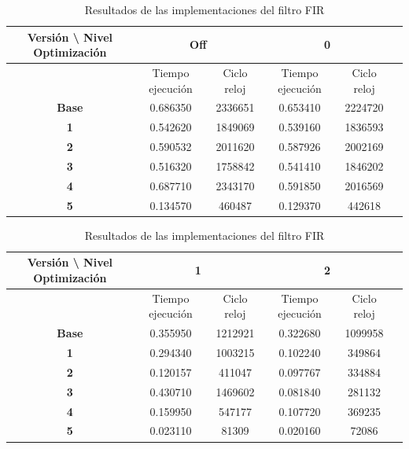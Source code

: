 \documentclass[11pt]{report}
\begin{document}
\begin{table}[H]
  \centering
  \begin{tabular}{|c|c|c|c|c|c|}
    \hline
    \textbf{Versión \textbackslash{} Nivel Optimización} & \multicolumn{2}{c|}{\textbf{Off}} & \multicolumn{2}{c|}{\textbf{0}} \\
    \hline
    & Tiempo ejecución & Ciclo reloj & Tiempo ejecución & Ciclo reloj \\
    \hline
    \textbf{Base} & 0.686350 & 2336651 & 0.653410 & 2224720 \\
    \hline
    \textbf{1} & 0.542620 & 1849069 & 0.539160 & 1836593 \\
    \hline
    \textbf{2} & 0.590532 & 2011620 & 0.587926 & 2002169 \\
    \hline
    \textbf{3} & 0.516320 & 1758842 & 0.541410 & 1846202 \\
    \hline
    \textbf{4} & 0.687710 & 2343170 & 0.591850 & 2016569 \\
    \hline
    \textbf{5} & 0.134570 & 460487 & 0.129370 & 442618 \\
    \hline
  \end{tabular}
  \caption{Resultados de las implementaciones del filtro FIR}
\end{table}

\begin{table}[H]
  \centering
  \begin{tabular}{|c|c|c|c|c|c|}
    \hline
    \textbf{Versión \textbackslash{} Nivel Optimización} & \multicolumn{2}{c|}{\textbf{1}} & \multicolumn{2}{c|}{\textbf{2}} \\
    \hline
    & Tiempo ejecución & Ciclo reloj & Tiempo ejecución & Ciclo reloj \\
    \hline
    \textbf{Base} & 0.355950 & 1212921 & 0.322680 & 1099958 \\
    \hline
    \textbf{1} & 0.294340 & 1003215 & 0.102240 & 349864 \\
    \hline
    \textbf{2} & 0.120157 & 411047 & 0.097767 & 334884 \\
    \hline
    \textbf{3} & 0.430710 & 1469602 & 0.081840 & 281132 \\
    \hline
    \textbf{4} & 0.159950 & 547177 & 0.107720 & 369235 \\
    \hline
    \textbf{5} & 0.023110 & 81309 & 0.020160 & 72086 \\
    \hline
  \end{tabular}
  \caption{Resultados de las implementaciones del filtro FIR}
\end{table}
\end{document}
